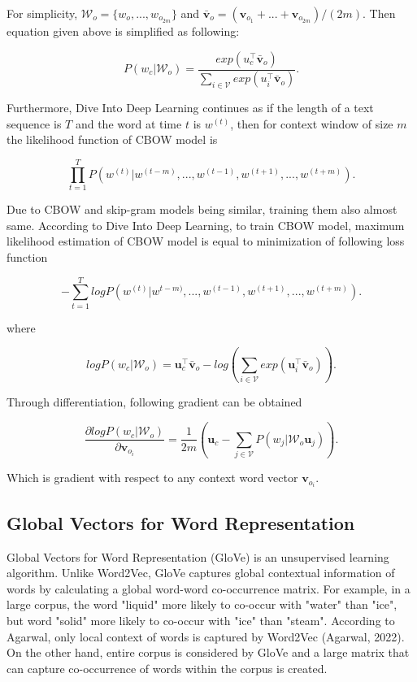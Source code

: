 \documentclass[man]{apa7}
\begin{document}
For simplicity, $\mathcal{W}_o = \{ w_o,...,w_{o_{2m}}\}$ and $\bar{\mathbf{v}}_o = (\mathbf{v}_{o_1}+...+\mathbf{v}_{o_{2m}})/(2m)$. Then equation given above is simplified as following:

\begin{equation}
P(w_c | \mathcal{W}_o) = \frac{exp(u_c^\top \bar{\mathbf{v}}_o)}{\sum_{i \in \mathcal{V}} exp(u_i^\top \bar{\mathbf{v}}_o)}.
\end{equation}

Furthermore, Dive Into Deep Learning continues as if the length of a text sequence is $\mathit{T}$ and the word at time $t$ is $w^{(t)}$, then for context window of size $m$ the likelihood function of CBOW model is

\begin{equation}
\prod_{t=1}^T P(w^{(t)}| w^{(t-m)},..., w^{(t-1)},w^{(t+1)},...,w^{(t+m)}).
\end{equation}

Due to CBOW and skip-gram models being similar, training them also almost same. According to Dive Into Deep Learning, to train CBOW model, maximum likelihood estimation of CBOW model is equal to minimization of following loss function

\begin{equation}
- \sum_{t=1}^T logP(w^{(t)} | w^{t-m)} ,..., w^{(t-1)} ,w^{(t+1)}, ...,w^{(t+m)}).
\end{equation}

where

\begin{equation}
logP(w_c | \mathcal{W}_o) = \mathbf{u}_c^\top \bar{\mathbf{v}}_o - log(\sum_{i \in \mathcal{V}} exp(\mathbf{u}_i^\top \bar{\mathbf{v}}_o)).
\end{equation}

Through differentiation, following gradient can be obtained

\begin{equation}
\frac{\partial log P(w_c| \mathcal{W}_o )}{\partial \mathbf{v}_{o_i}} = \frac{1}{2m}(\mathbf{u}_c - \sum_{j \in \mathcal{V}} P(w_j| \mathcal{W}_o \mathbf{u}_j)).
\end{equation}

Which is gradient with respect to any context word vector $\mathbf{v}_{o_i}$. 

\subsection{Global Vectors for Word Representation}
Global Vectors for Word Representation (GloVe) is an unsupervised learning algorithm. Unlike Word2Vec, GloVe captures global contextual information of words by calculating a global word-word co-occurrence matrix. For example, in a large corpus, the word "liquid" more likely to co-occur with "water" than "ice", but word "solid" more likely to co-occur with "ice" than "steam". According to Agarwal, only local context of words is captured by Word2Vec (Agarwal, 2022). On the other hand, entire corpus is considered by GloVe and a large matrix that can capture co-occurrence of words within the corpus is created.
\\[2\baselineskip]
\end{document}
